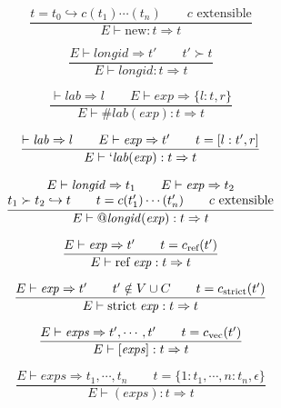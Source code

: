 \documentclass[twoside]{article}
\newcommand{\conarrow}{\hookrightarrow}
\newcommand{\x}[1]{\mathit{#1}}
\newcommand{\f}[1]{\mbox{#1}}
\renewcommand{\c}[1]{c_{\f{\scriptsize #1}}}
\newcommand{\lab}{\x{lab}}
\newcommand{\longid}{\x{longid}}
\renewcommand{\exp}{\x{exp}}
\newcommand{\exps}{\x{exps}}
\begin{document}
\begin{equation}
\frac{
t = t_0 \conarrow c(t_1)\cdots(t_n)
\qquad
\mbox{$c$ extensible}
}{
E \vdash \f{new} : t \Rightarrow t
}
\end{equation}

\begin{equation}
\frac{
E \vdash \longid \Rightarrow t'
\qquad
t' \succ t
}{
E \vdash \longid : t \Rightarrow t
}
\end{equation}

\begin{equation}
\frac{
\vdash \lab \Rightarrow l
\qquad
E \vdash \exp \Rightarrow \{l:t,r\}
}{
E \vdash \#\lab(\exp) : t \Rightarrow t
}
\end{equation}

\begin{equation}
\frac{
\vdash \lab \Rightarrow l
\qquad
E \vdash \exp \Rightarrow t'
\qquad
t = [l:t',r]
}{
E \vdash `\lab(\exp) : t \Rightarrow t
}
\end{equation}

\begin{equation}
\frac{
\begin{array}{@{}c@{}}
E \vdash \longid \Rightarrow t_1
\qquad
E \vdash \exp \Rightarrow t_2
\\
t_1 \succ t_2 \conarrow t
\qquad
t = c(t_1')\cdots(t_n')
\qquad
\mbox{$c$ extensible}
\end{array}
}{
E \vdash @\longid(\exp) : t \Rightarrow t
}
\end{equation}

\begin{equation}
\frac{
E \vdash \exp \Rightarrow t'
\qquad
t = \c{ref}(t')
}{
E \vdash \f{ref}\;\exp : t \Rightarrow t
}
\end{equation}

\begin{equation}
\frac{
E \vdash \exp \Rightarrow t'
\qquad
t' \notin V \cup C
\qquad
t = \c{strict}(t')
}{
E \vdash \f{strict}\;\exp : t \Rightarrow t
}
\end{equation}

\begin{equation}
\frac{
E \vdash \exps \Rightarrow t',\cdots,t'
\qquad
t = \c{vec}(t')
}{
E \vdash [\exps] : t \Rightarrow t
}
\end{equation}

\begin{equation}
\frac{
E \vdash \exps \Rightarrow t_1,\cdots,t_n
\qquad
t = \{1:t_1,\cdots,n:t_n,\epsilon\}
}{
E \vdash (\exps) : t \Rightarrow t
}
\end{equation}
\end{document}
